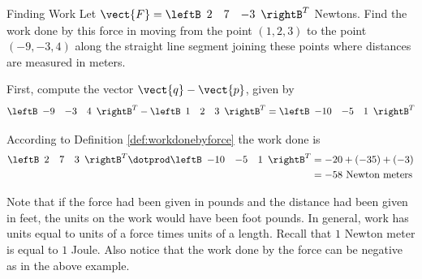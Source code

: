 \begin{example}{Finding Work}\label{exa:findingwork}
Let $\vect{F}=
\leftB
\begin{array}{rrr}
2 & 7 & -3
\end{array}
\rightB^T$ Newtons. Find the work
done by this force in moving from the point $\left( 1,2,3\right) $ to the
point $\left( -9,-3,4\right) $ along the straight line segment joining these
points where distances are measured in meters.
\end{example}

\begin{solution}
First, compute the vector $\vect{q} - \vect{p}$, given by 
\begin{equation*}
\leftB
\begin{array}{rrr}
-9 & -3 & 4
\end{array}
\rightB^T
-
\leftB
\begin{array}{rrr}
1 & 2 & 3
\end{array}
\rightB^T
=
\leftB
\begin{array}{rrr}
-10 & -5 & 1
\end{array}
\rightB^T
\end{equation*}

According to Definition \ref{def:workdonebyforce} the work done is
\begin{align*}
\leftB
\begin{array}{rrr}
2 & 7 & 3
\end{array}
\rightB^T
 \dotprod 
\leftB
\begin{array}{rrr}
-10 & -5 & 1
\end{array}
\rightB^T
& =-20+\left( -35\right) +\left(
-3\right) \\
& =-58\text{ Newton meters}
\end{align*}
\end{solution}

Note that if the force had been given in pounds and the distance had been
given in feet, the units on the work would have been foot pounds. In
general, work has units equal to units of a force times units of a length.
Recall that $1$ Newton meter is equal to $1$ Joule.  Also notice that the work done by the force can be negative as in the
above example.